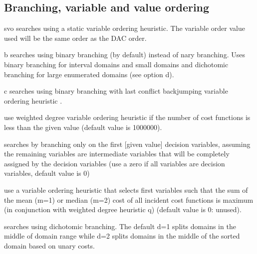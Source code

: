 \documentclass[letterpaper,10pt,openany,oneside,english]{sphinxmanual}
\begin{document}
\subsection{Branching, variable and value ordering}
\label{\detokenize{userdoc:branching-variable-and-value-ordering}}\begin{optionlist}{3cm}
\item [\sphinxhyphen{}svo]  
\sphinxAtStartPar
searches using a static variable ordering heuristic.
The variable order value used will be the same order as the DAC order.
\item [\sphinxhyphen{}b]  
\sphinxAtStartPar
searches using binary branching (by default) instead of n\sphinxhyphen{}ary branching.
Uses binary branching for interval domains and small domains
and dichotomic branching for large enumerated domains (see option \sphinxhyphen{}d).
\item [\sphinxhyphen{}c]  
\sphinxAtStartPar
searches using binary branching with last conflict
backjumping variable ordering heuristic .
\end{optionlist}
\begin{description}
\sphinxAtStartPar
use weighted degree variable ordering heuristic 
if the number of cost
functions is less than the given value (default value is 1000000).

\sphinxAtStartPar
searches by branching only on the first {[}given value{]}
decision variables, assuming the remaining variables are
intermediate variables that will be completely assigned by the
decision variables (use a zero if all variables are decision
variables, default value is 0)

\sphinxAtStartPar
use a variable ordering heuristic that selects first variables such
that the sum of the mean (m=1) or median (m=2) cost of all incident
cost functions is maximum 
(in conjunction with weighted degree
heuristic \sphinxhyphen{}q) (default value is 0: unused).

\sphinxAtStartPar
searches using dichotomic branching. The default d=1 splits domains
in the middle of domain range while d=2 splits domains in the middle
of the sorted domain based on unary costs.

\end{description}
\end{document}
